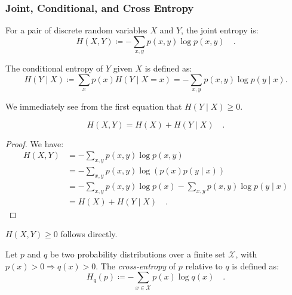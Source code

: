 \documentclass[../../main.tex]{subfiles}
\begin{document}
\bigskip
\subsubsection{Joint, Conditional, and Cross Entropy}

\begin{definition}
    For a pair of discrete random variables \( X \) and \( Y \), the joint entropy is:
    \[
        H(X, Y) \coloneqq -\sum_{x,y} p(x, y) \log p(x, y) \quad .
    \]
\end{definition}

\begin{definition}
    The conditional entropy of \( Y \) given \( X \) is defined as:
    \[
        H(Y \mid X) \coloneqq \sum_{x} p(x) H(Y \mid X = x) = -\sum_{x, y} p(x, y) \log p(y \mid x).
    \]
\end{definition}

\begin{corollary}
    We immediately see from the first equation that $H(Y \mid X) \geq 0$.
\end{corollary}

\pagebreak
\begin{theorem}
    \[
        H(X, Y) = H(X) + H(Y \mid X) \quad .
    \]
\end{theorem}
\vspace{-2.5em}
\begin{proof}
    We have:
    \begin{align*}
        H(X, Y) &= - \sum_{x,y} p(x, y) \log p(x, y) \\
        &= - \sum_{x,y} p(x, y) \log \left(p(x) p(y \mid x) \right) \\
        &= - \sum_{x,y} p(x, y) \log p(x) - \sum_{x,y} p(x, y) \log p(y \mid x) \\
        &= H(X) + H(Y \mid X) \quad .
    \end{align*}
\end{proof}

\begin{corollary}
    $H(X, Y) \geq 0$ follows directly.
\end{corollary}

\begin{definition}
    Let \( p \) and \( q \) be two probability distributions over a finite set \( \mathcal{X} \), with \( p(x) > 0 \Rightarrow q(x) > 0 \). The \emph{cross-entropy} of \( p \) relative to \( q \) is defined as:
    \[
        H_q(p) \coloneqq -\sum_{x \in \mathcal{X}} p(x) \log q(x) \quad .
    \]
\end{definition}
\end{document}
